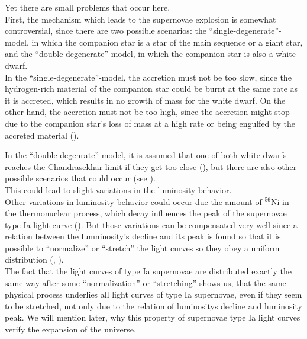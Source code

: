 \noindent Yet there are small problems that occur here. \\
First, the mechanism which leads to the supernovae explosion is somewhat controversial, since there are two possible scenarios: the ``single-degenerate''-model, in which the companion star is a star of the main sequence or a giant star, and the ``double-degenerate''-model, in which the companion star is also a white dwarf. \\

\noindent In the ``single-degenerate''-model, the accretion must not be too slow, since the hydrogen-rich material of the companion star could be burnt at the same rate as it is accreted, which results in no growth of mass for the white dwarf. On the other hand, the accretion must not be too high, since the accretion might stop due to the companion star's loss of mass at a high rate or being engulfed by the accreted material (\cite[p.~308]{Maguire2017}).

\noindent In the ``double-degenrate''-model, it is assumed that one of both white dwarfs reaches the Chandrasekhar limit if they get too close (\cite[p.~48]{Bartelmann2019}), but there are also other possible scenarios that could occur (see \cite[p.~308/309]{Maguire2017}). \\
\noindent This could lead to slight variations in the luminosity behavior. \\


\noindent Other variations in luminosity behavior could occur due the amount of $^{56}$Ni in the thermonuclear process, which decay influences the peak of the supernovae type Ia light curve (\cite[p.~295]{Maguire2017}). But those variations can be compensated very well since a relation between the lumninosity's decline and its peak is found so that it is possible to ``normalize'' or ``stretch'' the light curves so they obey a uniform distribution (\cite[p.~4]{Perlmutter2003}, \cite{Phillips1993}).\\
The fact that the light curves of type Ia supernovae are distributed exactly the same way after some ``normalization'' or ``stretching'' shows us, that the same physical process underlies all light curves of type Ia supernovae, even if they seem to be stretched, not only due to the relation of luminositys decline and luminosity peak. We will mention later, why this property of supernovae type Ia light curves verify the expansion of the universe.

